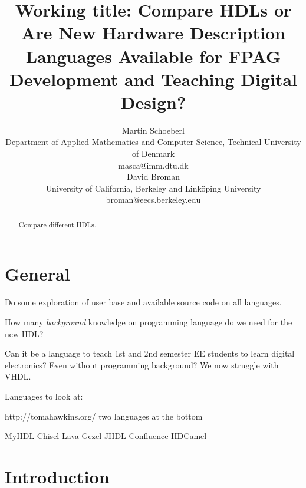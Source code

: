 \documentclass[10pt, conference, compsocconf]{IEEEtran}
\begin{document}
\newcommand{\shdl} {
  \lstset{keywords={comp,end,def,in,out,if,then,else,true,false,
      int,real,bool,string,int1,int2,int3,int4,int5,int6,int7,int8,
      int16,int32,type}, 
    morecomment=[l]{//},
    morecomment=[s]{/*}{*/}, morestring=[b]{"},
    basicstyle=\ttfamily\small, showstringspaces=false,
    keywordstyle=\bfseries, mathescape=true, }}


\title{Working title: Compare HDLs or\\
Are New Hardware Description Languages Available for FPAG
Development and Teaching Digital Design?}

\author{Martin Schoeberl\\
Department of Applied Mathematics and Computer Science, 
Technical University of Denmark\\masca@imm.dtu.dk
  \vspace{1ex}\\ 
David Broman\\
University of California, Berkeley and Link{\"o}ping University\\
broman@eecs.berkeley.edu
}



\maketitle \thispagestyle{empty}

\begin{abstract}
Compare different HDLs.
\end{abstract}

\section{General}

Do some exploration of user base and available source code on all languages.

How many \emph{background} knowledge on programming language do we need for the new HDL?

Can it be a language to teach 1st and 2nd semester EE students to learn digital
electronics? Even without programming background? We now struggle with VHDL.

Languages to look at:

http://tomahawkins.org/ two languages at the bottom

MyHDL
Chisel
Lava
Gezel
JHDL
Confluence
HDCamel


\section{Introduction}
\end{document}
